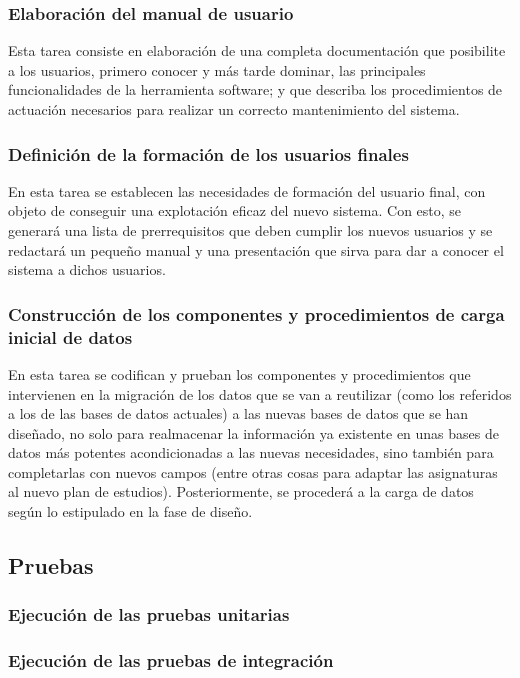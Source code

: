 \documentclass[11pt,a4paper,spanish,twoside]{book}
\begin{document}
\subsubsection{Elaboración del manual de usuario}
Esta tarea consiste en elaboración de una completa documentación que posibilite
a los usuarios, primero conocer y más tarde dominar, las principales
funcionalidades de la herramienta software; y que describa los procedimientos 
de actuación necesarios para realizar un correcto mantenimiento del sistema.

\subsubsection{Definición de la formación de los usuarios finales}
En esta tarea se establecen las necesidades de formación del usuario final, con
objeto de conseguir una explotación eficaz del nuevo sistema. Con esto, se 
generará una lista de prerrequisitos que deben cumplir los nuevos usuarios y 
se redactará un pequeño manual y una presentación que sirva para dar a conocer 
el sistema a dichos usuarios.

\subsubsection{Construcción de los componentes y procedimientos de carga
  inicial de datos}
En esta tarea se codifican y prueban los componentes y procedimientos que 
intervienen en la migración de los datos que se van a reutilizar (como los 
referidos a los de las bases de datos actuales) a las nuevas bases de datos 
que se han diseñado, no solo para realmacenar la información ya existente en
unas bases de datos más potentes acondicionadas a las nuevas necesidades, sino 
también para completarlas con nuevos campos (entre otras cosas para adaptar las
asignaturas al nuevo plan de estudios). Posteriormente, se procederá a la carga 
de datos según lo estipulado en la fase de diseño.

\subsection{Pruebas}
\subsubsection{Ejecución de las pruebas unitarias}
\subsubsection{Ejecución de las pruebas de integración}
\end{document}
